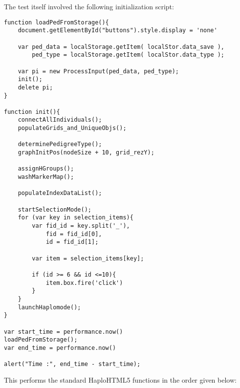 The test itself involved the following initialization script:

\pagebreak
\begingroup
\begin{spacing}{1}
\begin{lstlisting}[label=code:inithaplo]
function loadPedFromStorage(){
	document.getElementById("buttons").style.display = 'none'

	var ped_data = localStorage.getItem( localStor.data_save ),
		ped_type = localStorage.getItem( localStor.data_type );

	var pi = new ProcessInput(ped_data, ped_type);
	init();
	delete pi;
}

function init(){
	connectAllIndividuals();
	populateGrids_and_UniqueObjs();

	determinePedigreeType();
	graphInitPos(nodeSize + 10, grid_rezY);

	assignHGroups();
	washMarkerMap();

	populateIndexDataList();

	startSelectionMode();
	for (var key in selection_items){
		var fid_id = key.split('_'),
			fid = fid_id[0],
			id = fid_id[1];

		var item = selection_items[key];

		if (id >= 6 && id <=10){
			item.box.fire('click')
		}
	}
	launchHaplomode();
}

var start_time = performance.now()
loadPedFromStorage();
var end_time = performance.now()

alert("Time :", end_time - start_time);
\end{lstlisting}
\vspace{-10pt}
\end{spacing}
\endgroup


This performs the standard HaploHTML5 functions in the order given below:

